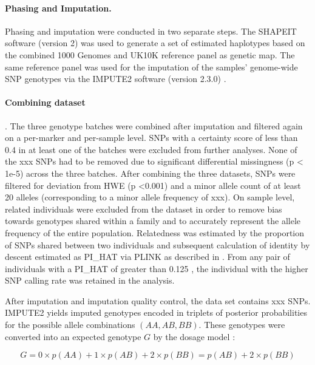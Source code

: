 \paragraph{Phasing and Imputation.} Phasing and imputation were conducted in two separate steps. The SHAPEIT software (version 2) \citep{Delaneau2012,Delaneau2013} was used to generate a set of estimated haplotypes based on the combined 1000 Genomes \citep{Abecasis2012} and UK10K \citep{UK10KConsortium2014} reference panel as genetic map. The same reference panel was used for the imputation of the samples’ genome-wide SNP genotypes via the IMPUTE2 software (version 2.3.0) \citep{Marchini2007, Howie2009}. 
\paragraph{Combining dataset}. The three genotype batches were combined after imputation and filtered again on a per-marker and per-sample level. SNPs with a certainty score of less than 0.4 in at least one of the batches were excluded from further analyses. None of the xxx SNPs had to be removed due to significant differential missingness (p < 1e-5) across the three batches. After combining the three datasets, SNPs were filtered for deviation from HWE (p <0.001) and a minor allele count of at least 20 alleles (corresponding to a minor allele frequency of xxx).  On sample level, related individuals were excluded from the dataset in order to remove bias towards genotypes shared within a family and to accurately represent the allele frequency of the entire population. Relatedness was estimated by the proportion of SNPs shared between two individuals and subsequent calculation of identity by descent estimated as PI\_HAT via PLINK as described in \citep{Anderson2010}. From any pair of individuals with a PI\_HAT of greater than 0.125 , the individual with the higher SNP calling rate was retained in the analysis. 

After imputation and imputation quality control, the data set contains xxx SNPs. IMPUTE2 yields imputed genotypes encoded in triplets of posterior probabilities for the possible allele combinations \((AA, AB, BB)\). These genotypes were converted into an expected genotype \(G\) by the dosage model \citep{Howie2011}:

\begin{equation}
	G = 0 \times p(AA) + 1 \times p(AB) + 2 \times p(BB) = p(AB) + 2 \times p(BB)
\end{equation}


